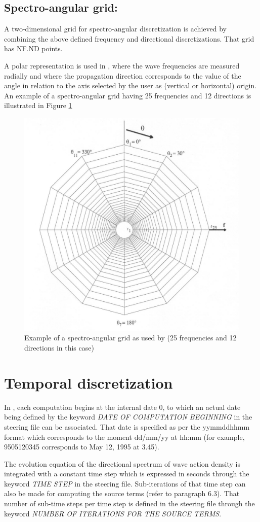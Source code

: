 \subsection{ Spectro-angular grid:}

 A two-dimensional grid for spectro-angular discretization is achieved by combining the above defined frequency and directional discretizations. That grid has NF.ND points.

 A polar representation is used in \tomawac, where the wave frequencies are measured radially and where the propagation direction corresponds to the value of the angle in relation to the axis selected by the user as (vertical or horizontal) origin. An example of a spectro-angular grid having 25 frequencies and 12 directions is illustrated in Figure \ref{fig:spectroangular}
\begin{figure}[htbp]%
\begin{center}
\includegraphics*[width=4.in]{graphics/spectroangular}
\caption{Example of a spectro-angular grid as used by \tomawac (25 frequencies and 12 directions in this case)}
\label{fig:spectroangular}
\end{center}
\end{figure}

\section{ Temporal discretization}
\label{se:tempordis}

 In \tomawac, each computation begins at the internal date 0, to which an actual date being defined by the keyword \textit{DATE OF COMPUTATION BEGINNING} in the steering file can be associated. That date is specified as per the yymmddhhmm format which corresponds to the moment dd/mm/yy at hh:mm (for example, 9505120345 corresponds to May 12, 1995 at 3.45).

 The evolution equation of the directional spectrum of wave action density is integrated with a constant time step which is expressed in seconds through the keyword \textit{TIME STEP} in the steering file. Sub-iterations of that time step can also be made for computing the source terms (refer to paragraph 6.3). That number of sub-time steps per time step is defined in the steering file through the keyword \textit{NUMBER OF ITERATIONS FOR THE SOURCE TERMS}.

